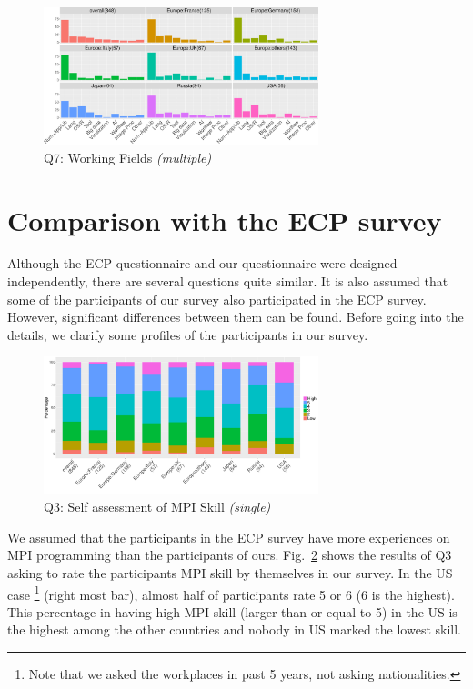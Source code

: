 \documentclass[conference,10pt,letterpaper]{IEEEtran}
\begin{document}
\begin{figure}[htb]
  \begin{center}
    \includegraphics[width=8cm]{R-scripts/Q7.pdf}
    \caption{Q7: Working Fields {\it(multiple)}}
    \label{fig:working-fields}
  \end{center}
\end{figure}

\section{Comparison with the ECP survey}

Although the ECP questionnaire and our questionnaire were designed
independently, there are several questions quite similar. It is also
assumed that some of the participants of our survey 
also participated in the ECP survey. However, significant differences
between them can be found. Before going into the details, we clarify
some profiles of the participants in our survey.

\begin{figure}[htb]
  \begin{center}
    \includegraphics[width=8cm]{R-scripts/Q3.pdf}
    \caption{Q3: Self assessment of MPI Skill {\it(single)}}
    \label{fig:mpi-skill}
  \end{center}
\end{figure}

We assumed that the participants in the ECP survey have more
experiences on MPI
programming than the participants of ours. Fig.~\ref{fig:mpi-skill} 
shows the results of Q3 asking to rate the participants MPI skill by
themselves in our survey.  In the US case 
\footnote{Note that we asked
  the workplaces in past 5 years, not asking nationalities.}
(right most bar), almost half of participants rate 5 or 6
(6 is the highest). This percentage in having high MPI skill (larger
than or equal to 5) in the US is the highest among the other
countries and nobody in US marked the lowest skill.
\end{document}
